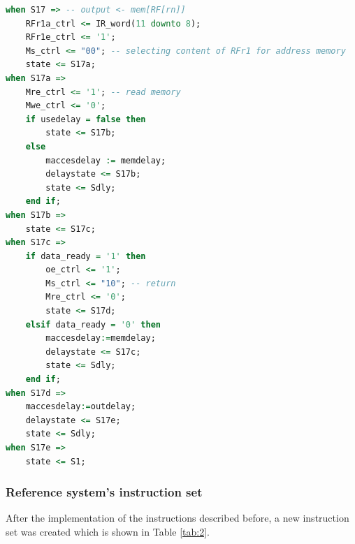 \documentclass[]{article}
\begin{document}
\begin{lstlisting}[language=vhdl, caption={Indexed memory out state vhdl}, label={}]
when S17 => -- output <- mem[RF[rn]]   
	RFr1a_ctrl <= IR_word(11 downto 8);	
	RFr1e_ctrl <= '1';  
	Ms_ctrl <= "00"; -- selecting content of RFr1 for address memory					
	state <= S17a;				
when S17a => 
	Mre_ctrl <= '1'; -- read memory
	Mwe_ctrl <= '0';
	if usedelay = false then 
		state <= S17b;
	else 
		maccesdelay := memdelay;
		delaystate <= S17b;
		state <= Sdly;
	end if;
when S17b =>					
	state <= S17c;
when S17c =>
	if data_ready = '1' then
		oe_ctrl <= '1';
		Ms_ctrl <= "10"; -- return				
		Mre_ctrl <= '0';
		state <= S17d;
	elsif data_ready = '0' then
		maccesdelay:=memdelay;
		delaystate <= S17c;
		state <= Sdly;
	end if;
when S17d =>
	maccesdelay:=outdelay;
	delaystate <= S17e;
	state <= Sdly;
when S17e => 
	state <= S1;
\end{lstlisting}

\subsubsection{Reference system's instruction set}

After the implementation of the instructions described before, a new instruction set was created which is shown in Table \ref{tab:2}.
\end{document}
